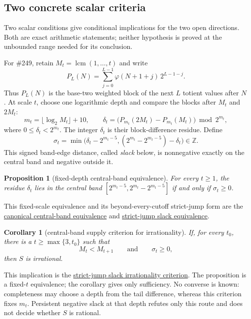\documentclass[11pt]{article}
\newcommand{\commit}{ebc98ee71f6819bd9fe344a0bb343542c604e533}
\newcommand{\repobase}{https://github.com/wcook04/plectis-lean-erdos249-257/blob/\commit}
\newcommand{\PK}{Erdos249257}
\newcommand{\lword}[4]{\href{\repobase/\PK/#1\#L#2}{#4}}
\newtheorem{proposition}[theorem]{Proposition}
\newtheorem{corollary}[theorem]{Corollary}
\theoremstyle{definition}
\theoremstyle{remark}
\newcommand{\Z}{\mathbb{Z}}
\newcommand{\ph}{\varphi}
\newcommand{\lcm}{\operatorname{lcm}}
\begin{document}
\subsection{Two concrete scalar criteria}

Two scalar conditions give conditional implications for the two open
directions.  Both are exact arithmetic statements; neither hypothesis is
proved at the unbounded range needed for its conclusion.

For \#249, retain $M_t=\lcm(1,\ldots,t)$ and write
\[
 P_L(N)=\sum_{j=0}^{L-1}\ph(N+1+j)\,2^{L-1-j}.
\]
Thus \(P_L(N)\) is the base-two weighted block of the next \(L\) totient
values after \(N\).  At scale \(t\), choose one logarithmic depth and compare
the blocks after \(M_t\) and \(2M_t\):
\[
 m_t=\lfloor\log_2 M_t\rfloor+10,\qquad
 \delta_t=\bigl(P_{m_t}(2M_t)-P_{m_t}(M_t)\bigr)\bmod 2^{m_t},
\]
where $0\le \delta_t<2^{m_t}$.  The integer \(\delta_t\) is their block-difference
residue.  Define
\[
  \sigma_t=\min\bigl(\delta_t-2^{m_t-5},
    (2^{m_t}-2^{m_t-5})-\delta_t\bigr)\in\Z.
\]
This signed band-edge distance, called \emph{slack} below, is nonnegative
exactly on the central band and negative outside it.

\begin{proposition}[fixed-depth central-band equivalence]\label{res:slackfrontier}
For every $t\ge1$, the residue \(\delta_t\) lies in the central band
$[2^{m_t-5},2^{m_t}-2^{m_t-5}]$ if and only if $\sigma_t\ge0$.
\end{proposition}
\noindent This fixed-scale equivalence and its beyond-every-cutoff strict-jump
form are the
\lword{DiagonalFreshLossBridge.lean}{2469}{canonicalAdjacentSuffixCentral_iff_slack_nonneg}{canonical central-band equivalence}
and
\lword{DiagonalFreshLossBridge.lean}{2559}{canonicalAdjacentSuffixJumpCentralSupply_iff_slackSupply}{strict-jump slack equivalence}.

\begin{corollary}[central-band supply criterion for irrationality]
\label{res:slackcriterion}
If, for every $t_0$, there is a $t\ge\max\{3,t_0\}$ such that
\[
 M_t<M_{t+1}\qquad\text{and}\qquad \sigma_t\ge0,
\]
then $S$ is irrational.
\end{corollary}
\noindent This implication is the
\lword{DiagonalFreshLossBridge.lean}{2731}{irrational_totientSeries_of_canonicalAdjacentSuffixJumpSlackSupply}{strict-jump slack irrationality criterion}.
The proposition is a fixed-\(t\) equivalence; the corollary gives only
sufficiency.  No converse is known: completeness may choose a depth from the
tail difference, whereas this criterion fixes \(m_t\).  Persistent negative
slack at that depth refutes only this route and does not decide whether \(S\)
is rational.
\end{document}
